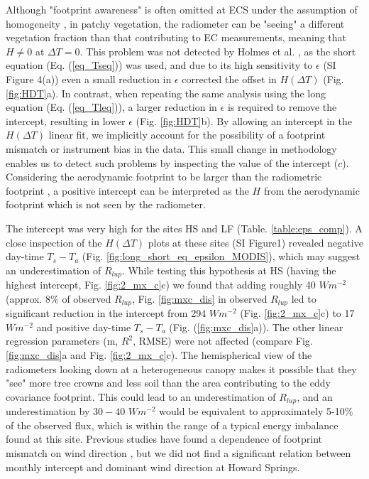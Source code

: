 \documentclass[fleqn,10pt]{wlscirep}
\begin{document}
 Although "footprint awareness" is often omitted at ECS under the assumption of ho­mogeneity \cite{chu2021representativeness}, in patchy vegetation, the radiometer can be "seeing" a different vegetation fraction than that contributing to EC measurements, meaning that $H\not= 0$ at $\Delta T=0$. This problem was not detected by Holmes et al. \cite{holmes2009land}, as the short equation (Eq. (\ref{eq_Tseq})) was used, and due to its high sensitivity to $\epsilon$ (SI Figure 4(a)) even a small reduction in $\epsilon$ corrected the offset in $H(\Delta T)$ (Fig. \ref{fig:HDT}a). In contrast, when repeating the same analysis using the long equation (Eq. (\ref{eq_Tleq})), a larger reduction in $\epsilon$ is required to remove the intercept, resulting in lower $\epsilon$ (Fig. \ref{fig:HDT}b). By allowing an intercept in the $H(\Delta T)$ linear fit, we implicitly account for the possibility of a footprint mismatch or instrument bias in the data. This small change in methodology enables us to detect such problems by inspecting the value of the intercept ($c$). Considering  the aerodynamic footprint to be larger than the radiometric footprint \cite{marcolla2018geometry,chu2021representativeness}, a positive intercept can be interpreted as the $H$ from the aerodynamic footprint which is not seen by the radiometer. 

The intercept was very high for the sites HS and LF (Table. \ref{table:eps_comp}). A close inspection of the $H(\Delta T)$ plots at these sites (SI Figure1) revealed negative day-time $T_{s} - T_{a}$ (Fig. \ref{fig:long_short_eq_epsilon_MODIS}), which may suggest an underestimation of $R_{lup}$. While testing this hypothesis at HS (having the highest intercept, Fig. \ref{fig:2_mx_c}c) we found that adding roughly 40 $Wm^{-2}$ (approx. 8\% of observed $R_{lup}$, Fig. \ref{fig:mxc_dis} in observed $R_{lup}$ led to significant reduction in the intercept from 294 $Wm^{-2}$ (Fig. \ref{fig:2_mx_c}c) to 17 $Wm^{-2}$ and positive day-time $T_{s} - T_{a}$ (Fig. (\ref{fig:mxc_dis}a)). The other linear regression parameters (m, $R^{2}$, RMSE) were not affected (compare Fig. \ref{fig:mxc_dis}a and Fig. \ref{fig:2_mx_c}c). The hemispherical view of the radiometers looking down at a heterogeneous canopy makes it possible that they "see" more tree crowns and less soil than the area contributing to the eddy covariance footprint. This could lead to an underestimation of $R_{lup}$, and an underestimation by $30-40$ $Wm^{-2}$ would be equivalent to approximately 5-10$\%$ of the observed flux, which is within the range of a typical energy imbalance found at this site. Previous studies have found a dependence of footprint mismatch on wind direction \cite{chu2021representativeness,marcolla2018geometry,morillas2013using}, but we did not find a significant relation between monthly intercept and dominant wind direction at Howard Springs.
 
\end{document}

